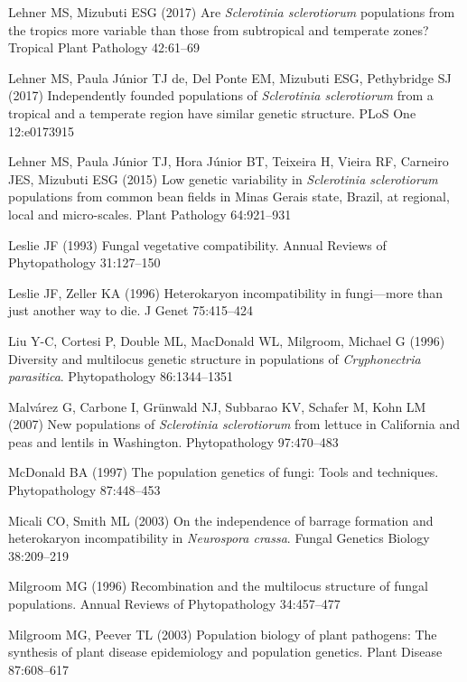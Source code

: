 \hypertarget{ref-Lehner2017-ny}{}
Lehner MS, Mizubuti ESG (2017) Are \emph{Sclerotinia sclerotiorum}
populations from the tropics more variable than those from subtropical
and temperate zones? Tropical Plant Pathology 42:61--69

\hypertarget{ref-Lehner2017-mm}{}
Lehner MS, Paula Júnior TJ de, Del Ponte EM, Mizubuti ESG, Pethybridge
SJ (2017) Independently founded populations of \emph{Sclerotinia
sclerotiorum} from a tropical and a temperate region have similar
genetic structure. PLoS One 12:e0173915

\hypertarget{ref-Lehner2015-oj}{}
Lehner MS, Paula Júnior TJ, Hora Júnior BT, Teixeira H, Vieira RF,
Carneiro JES, Mizubuti ESG (2015) Low genetic variability in \emph{Sclerotinia
sclerotiorum} populations from common bean fields in Minas Gerais state,
Brazil, at regional, local and micro-scales. Plant Pathology 64:921--931

\hypertarget{ref-Leslie1993-hj}{}
Leslie JF (1993) Fungal vegetative compatibility. Annual Reviews of
Phytopathology 31:127--150

\hypertarget{ref-Leslie1996-di}{}
Leslie JF, Zeller KA (1996) Heterokaryon incompatibility in fungi---more
than just another way to die. J Genet 75:415--424

\hypertarget{ref-Liu1996-dr}{}
Liu Y-C, Cortesi P, Double ML, MacDonald WL, Milgroom, Michael G (1996)
Diversity and multilocus genetic structure in populations of
\emph{Cryphonectria parasitica}. Phytopathology 86:1344--1351

\hypertarget{ref-Malvarez2007-jo}{}
Malvárez G, Carbone I, Grünwald NJ, Subbarao KV, Schafer M, Kohn LM
(2007) New populations of \emph{Sclerotinia sclerotiorum} from lettuce
in California and peas and lentils in Washington. Phytopathology
97:470--483

\hypertarget{ref-McDonald1997-ob}{}
McDonald BA (1997) The population genetics of fungi: Tools and
techniques. Phytopathology 87:448--453

\hypertarget{ref-Micali2003-li}{}
Micali CO, Smith ML (2003) On the independence of barrage formation and
heterokaryon incompatibility in \emph{Neurospora crassa}. Fungal Genetics
Biology 38:209--219

\hypertarget{ref-Milgroom1996-we}{}
Milgroom MG (1996) Recombination and the multilocus structure of fungal
populations. Annual Reviews of Phytopathology 34:457--477

\hypertarget{ref-Milgroom2003-mu}{}
Milgroom MG, Peever TL (2003) Population biology of plant pathogens: The
synthesis of plant disease epidemiology and population genetics. Plant
Disease 87:608--617

